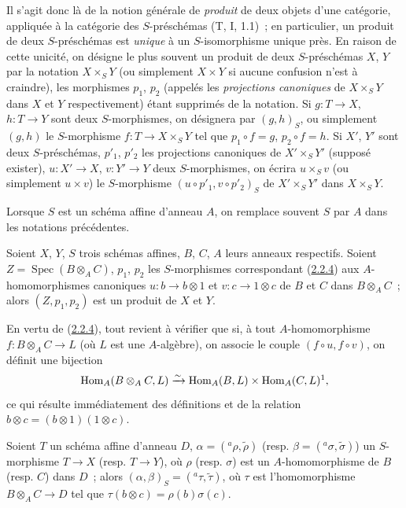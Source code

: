 Il s'agit donc là de la notion générale de \emph{produit} de deux objets d'une
catégorie, appliquée à la catégorie des $S$-préschémas (T, I, 1.1)~; en
particulier, un produit de deux $S$-préschémas est \emph{unique} à un
$S$-isomorphisme unique près. En raison de cette unicité, on désigne le plus
souvent un produit de deux $S$-préschémas $X$, $Y$ par la notation
$X\times_S Y$ (ou simplement $X\times Y$ si aucune confusion n'est à craindre),
les morphismes $p_1$, $p_2$ (appelés les \emph{projections canoniques} de
$X\times_S Y$ dans $X$ et $Y$ respectivement) étant supprimés de la notation.
Si $g:T\to X$, $h:T\to Y$ sont deux $S$-morphismes, on désignera par
$(g,h)_S$, ou simplement $(g,h)$ le $S$-morphisme
$f:T\to X\times_S Y$ tel que $p_1\circ f=g$, $p_2\circ f=h$. Si $X'$, $Y'$
sont deux $S$-préschémas, $p'_1$, $p'_2$ les projections canoniques de
$X'\times_S Y'$ (supposé exister), $u:X'\to X$, $v:Y'\to Y$ deux
$S$-morphismes, on écrira $u\times_S v$ (ou simplement $u\times v$) le
$S$-morphisme $(u\circ p'_1,v\circ p'_2)_S$ de $X'\times_S Y'$ dans
$X\times_S Y$.

Lorsque $S$ est un schéma affine d'anneau $A$, on remplace souvent $S$ par $A$
dans les notations précédentes.

\begin{proposition}[3.2.2]
\label{I.3.2.2-fr}
Soient $X$, $Y$, $S$ trois schémas affines, $B$, $C$, $A$ leurs anneaux
respectifs. Soient $Z=\operatorname{Spec}(B\otimes_A C)$, $p_1$, $p_2$ les
$S$-morphismes correspondant \textup{(\hyperref[I.2.2.4-fr]{2.2.4})} aux
$A$-homomorphismes canoniques $u:b\to b\otimes1$ et
$v:c\to1\otimes c$ de $B$ et $C$ dans $B\otimes_A C$~; alors
$(Z,p_1,p_2)$ est un produit de $X$ et $Y$.
\end{proposition}

En vertu de (\hyperref[I.2.2.4-fr]{2.2.4}), tout revient à vérifier que si, à
tout $A$-homomorphisme $f:B\otimes_A C\to L$ (où $L$ est une $A$-algèbre), on
associe le couple $(f\circ u,f\circ v)$, on définit une bijection
\[
  \operatorname{Hom}_A(B\otimes_A C,L)\xrightarrow{\sim}
  \operatorname{Hom}_A(B,L)\times\operatorname{Hom}_A(C,L)\footnotemark,
\]
 ce qui résulte immédiatement des définitions
et de la relation $b\otimes c=(b\otimes1)(1\otimes c)$.

\begin{corollary}[3.2.3]
\label{I.3.2.3-fr}
Soient $T$ un schéma affine d'anneau $D$,
$\alpha=({}^a\rho,\widetilde{\rho})$
\textup{(resp. $\beta=({}^a\sigma,\widetilde{\sigma})$)} un $S$-morphisme $T\to X$
\textup{(resp. $T\to Y$)}, où $\rho$ \textup{(resp. $\sigma$)} est un $A$-homomorphisme de $B$
\textup{(resp. $C$)} dans $D$~; alors
$(\alpha,\beta)_S=({}^a\tau,\widetilde{\tau})$, où $\tau$ est l'homomorphisme
$B\otimes_A C\to D$ tel que $\tau(b\otimes c)=\rho(b)\sigma(c)$.
\end{corollary}

